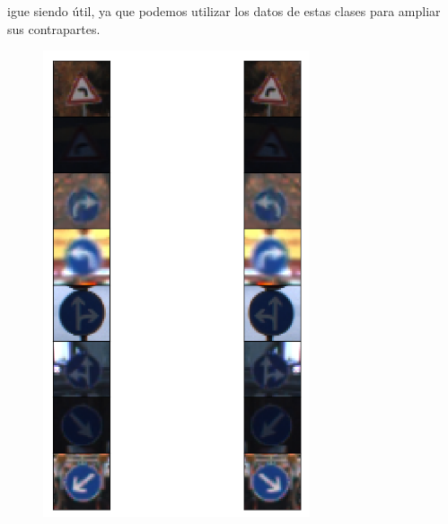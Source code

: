 {igue siendo útil, ya que podemos utilizar los datos de estas clases para ampliar sus contrapartes.
			\begin{figure}[H]
				\begin{center}
				\includegraphics[width=0.7\textwidth,height=0.65\textheight,keepaspectratio ]{images/desarrollo/Augment/cross_flippable}
				\end{center}
				
				
			
			\end{figure}

}



